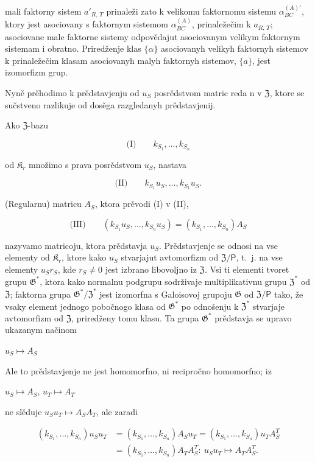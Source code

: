 \documentclass[11pt]{article}
\begin{document}
mali faktorny sistem \(a'_{R,\,T}\) prinaleži zato k velikomu faktornomu sistemu \(\alpha^{(A)\prime}_{BC}\), ktory jest asociovany s faktornym sistemom \(\alpha^{(A)}_{BC}\), prinaležečim k \(a_{R,\,T}\); asociovane male faktorne sistemy odpovědajut asociovanym velikym faktornym sistemam i obratno. Priredženje klas \(\{\alpha\}\) asociovanyh velikyh faktornyh sistemov k prinaležečim klasam asociovanyh malyh faktornyh sistemov, \(\{a\}\), jest izomorfizm grup.

Nyně prěhodimo k prědstavjenju od \(u_S\) posrědstvom matric reda n v \(\mathfrak{Z}\), ktore se sučstveno razlikuje od dosěga razgledanyh prědstavjenij.

Ako \(\mathfrak Z\)-bazu

\[
\text{(I)}\qquad k_{S_1}, \ldots, k_{S_n}
\]

od \(\mathfrak K_r\) množimo s prava posrědstvom \(u_S\), nastava

\[
\text{(II)}\qquad k_{S_1}u_S, \ldots, k_{S_1}u_S.
\]

(Regularnu) matricu \(A_S\), ktora prěvodi (I) v (II),

\[
\text{(III)}\qquad (k_{S_1}u_S, \ldots, k_{S_n}u_S) = (k_{S_1}, \ldots, k_{S_n})A_S
\]

nazyvamo matricoju, ktora prědstavja \(u_S\). Prědstavjenje se odnosi na vse elementy od \(\mathfrak K_{r}\), ktore kako \(u_S\) stvarjajut avtomorfizm od \(\mathfrak Z/\mathsf{P}\), t.~j. na vse elementy \(u_Sr_S\), kde \(r_S \neq 0\) jest izbrano libovoljno iz \(\mathfrak Z\). Vsi ti elementi tvoret grupu \(\mathfrak G^*\), ktora kako normalnu podgrupu sodrživaje multiplikativnu grupu \(\mathfrak Z^*\) od \(\mathfrak Z\); faktorna grupa \(\mathfrak G^*/\mathfrak Z^*\) jest izomorfna s Galoisovoj grupoju \(\mathfrak G\) od \(\mathfrak Z/\mathsf{P}\) tako, že vsaky element jednogo pobočnogo klasa od \(\mathfrak G^*\) po odnošenju k \(\mathfrak Z^*\) stvarjaje avtomorfizm od \(\mathfrak Z\), priredženy tomu klasu. Ta grupa \(\mathfrak G^*\) prědstavja se upravo ukazanym načinom

\(u_S \mapsto A_S\)

Ale to prědstavjenje ne jest homomorfno, ni recipročno homomorfno; iz

\(u_S \mapsto A_S\), \(u_T \mapsto A_T\)

ne slěduje \(u_Su_T \mapsto A_SA_T\), ale zaradi

\[
\begin{aligned}
(k_{S_1}, \ldots, k_{S_n})u_Su_T
&=(k_{S_1}, \ldots, k_{S_n})A_Su_T
=(k_{S_1}, \ldots, k_{S_n})u_TA_S^T\\
&=(k_{S_1}, \ldots, k_{S_n})A_TA_S^T:\ u_Su_T\mapsto A_TA_S^T.
\end{aligned}
\]
\end{document}
